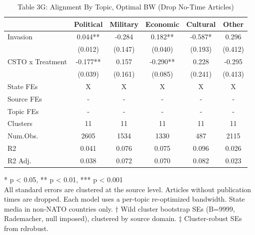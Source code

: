 \begin{table}[t]
\caption{\label{tab:table3g}Table 3G: Alignment By Topic, Optimal BW (Drop No-Time Articles)} 
\fontsize{12.0pt}{14.0pt}\selectfont
\begin{tabular*}{\linewidth}{@{\extracolsep{\fill}}lccccc}
\toprule
  & Political & Military & Economic & Cultural & Other \\ 
\midrule\addlinespace[2.5pt]
Invasion & 0.044** & -0.284 & 0.182** & -0.587* & 0.296 \\ 
 & (0.012) & (0.147) & (0.040) & (0.193) & (0.412) \\ 
CSTO x Treatment & -0.177** & 0.157 & -0.290** & 0.228 & -0.295 \\ 
{} & {(0.039)} & {(0.161)} & {(0.085)} & {(0.241)} & {(0.413)} \\ 
State FEs & X & X & X & X & X \\ 
Source FEs & - & - & - & - & - \\ 
Topic FEs & - & - & - & - & - \\ 
Clusters & 11 & 11 & 11 & 11 & 11 \\ 
Num.Obs. & 2605 & 1534 & 1330 & 487 & 2115 \\ 
R2 & 0.041 & 0.076 & 0.075 & 0.096 & 0.026 \\ 
R2 Adj. & 0.038 & 0.072 & 0.070 & 0.082 & 0.023 \\ 
\bottomrule
\end{tabular*}
\begin{minipage}{\linewidth}
\vspace{.05em}
* p < 0.05, ** p < 0.01, *** p < 0.001\\
All standard errors are clustered at the source level. Articles without
publication times are dropped. Each model uses a per-topic re-optimized
bandwidth. State media in non-NATO countries only. † Wild cluster bootstrap SEs
(B=9999, Rademacher, null imposed), clustered by source domain. ‡ Cluster-robust
SEs from rdrobust.\\
\end{minipage}
\end{table}


